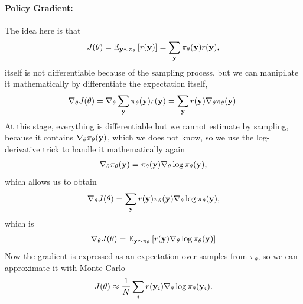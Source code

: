 \documentclass[11pt]{article}  %
\begin{document}
\paragraph{Policy Gradient:}
The idea here is that 
\begin{align*}
  J(\theta) = \mathbb{E}_{\mathbf{y} \sim \pi_{\theta}}\left[r(\mathbf{y})\right] = \sum_{\mathbf{y}} \pi_{\theta}(\mathbf{y}) r(\mathbf{y}),
\end{align*}
itself is not differentiable because of the sampling process, but we can manipilate it mathematically by differentiate the expectation itself,
\begin{align*}
  \nabla_\theta J(\theta) = \nabla_\theta  \sum_{\mathbf{y}} \pi_{\theta}(\mathbf{y}) r(\mathbf{y}) = \sum_{\mathbf{y}} r(\mathbf{y})\nabla_\theta \pi_\theta(\mathbf{y}).
\end{align*}
At this stage, everything is differentiable but we  cannot estimate by sampling, because it contains $\nabla_\theta \pi_\theta(\mathbf{y})$, which we does not know, so we use the log-derivative trick to handle it mathematically again 
\begin{align*}
  \nabla_\theta \pi_{\theta}(\mathbf{y}) = \pi_{\theta}(\mathbf{y}) \nabla_\theta \log \pi_{\theta}(\mathbf{y}),
\end{align*}
which allows us to obtain 
\begin{align*}
  \nabla_\theta J(\theta) = \sum_{\mathbf{y}} r(\mathbf{y})\pi_\theta(\mathbf{y})\nabla_\theta \log \pi_{\theta}(\mathbf{y}),
\end{align*}
which is 
\begin{align*}
  \nabla_\theta J(\theta) = \mathbb{E}_{\mathbf{y} \sim \pi_\theta}\left[r(\mathbf{y})\nabla_\theta \log \pi_{\theta}(\mathbf{y})\right]
\end{align*}
Now the gradient is expressed as an expectation over samples from $\pi_{\theta}$, so we can approximate it with Monte Carlo 
\begin{align*}
  J(\theta) \approx \frac{1}{N}\sum_{i} r(\mathbf{y}_i)\nabla_\theta \log \pi_\theta(\mathbf{y}_i).
\end{align*}
\end{document}
